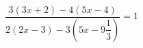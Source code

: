 \begin{ex}[type=equation]
	\begin{condition}
		$\dfrac{3(3x+2)-4(5x - 4)}{2(2x-3)-3\left(5x - 9\dfrac{1}{3}\right)} = 1$
	\end{condition}
\end{ex}
